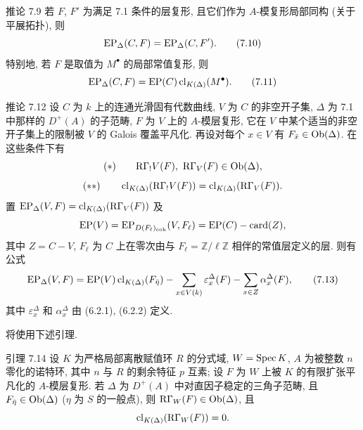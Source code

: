 \begin{statement}{推论 7.9}
若 $F$, $F'$ 为满足 7.1 条件的层复形, 且它们作为 $A$-模复形局部同构 (关于平展拓扑), 则
\[
\operatorname{EP}_\Delta(C,F)=\operatorname{EP}_\Delta(C,F').
\tag{7.10}
\]
特别地, 若 $F$ 是取值为 $M^\bullet$ 的局部常值复形, 则
\[
\operatorname{EP}_\Delta(C,F)=\operatorname{EP}(C)\operatorname{cl}_{K(\Delta)}(M^\bullet).
\tag{7.11}
\]
\end{statement}

\begin{statement}{推论 7.12}
设 $C$ 为 $k$ 上的连通光滑固有代数曲线, $V$ 为 $C$ 的非空开子集, $\Delta$ 为 7.1 中那样的 $D^+(A)$ 的子范畴, $F$ 为 $V$ 上的 $A$-模层复形, 它在 $V$ 中某个适当的非空开子集上的限制被 $V$ 的 Galois 覆盖平凡化. 再设对每个 $x\in V$ 有 $F_{\bar x}\in\operatorname{Ob}(\Delta)$. 在这些条件下有
\[
(*)\qquad \RG_!V(F),\ \RG_V(F)\in\Ob(\Delta),
\]
\[
(**)\qquad
\operatorname{cl}_{K(\Delta)}(\mathrm R\Gamma_!V(F))=\operatorname{cl}_{K(\Delta)}(\mathrm R\Gamma_V(F)).
\]
置 $\operatorname{EP}_\Delta(V,F)=\operatorname{cl}_{K(\Delta)}(\mathrm R\Gamma_V(F))$ 及
\[
\operatorname{EP}(V)=\operatorname{EP}_{D(F_\ell)_{\mathrm{coh}}}(V,F_\ell)=\operatorname{EP}(C)-\operatorname{card}(Z),
\]
其中 $Z=C-V$, $F_\ell$ 为 $C$ 上在零次由与 $F_\ell=\mathbb Z/\ell\mathbb Z$ 相伴的常值层定义的层. 则有公式
\[
\operatorname{EP}_\Delta(V,F)
=
\operatorname{EP}(V)\operatorname{cl}_{K(\Delta)}(F_{\bar\eta})
-\sum_{x\in V(k)}\varepsilon_x^\Delta(F)
-\sum_{x\in Z}\alpha_x^\Delta(F),
\tag{7.13}
\]
其中 $\varepsilon_x^\Delta$ 和 $\alpha_x^\Delta$ 由 (6.2.1), (6.2.2) 定义.
\end{statement}

将使用下述引理.

\begin{statement}{引理 7.14}
设 $K$ 为严格局部离散赋值环 $R$ 的分式域, $W=\operatorname{Spec} K$, $A$ 为被整数 $n$ 零化的诺特环, 其中 $n$ 与 $R$ 的剩余特征 $p$ 互素; 设 $F$ 为 $W$ 上被 $K$ 的有限扩张平凡化的 $A$-模层复形. 若 $\Delta$ 为 $D^+(A)$ 中对直因子稳定的三角子范畴, 且 $F_{\bar\eta}\in\operatorname{Ob}(\Delta)$ ($\eta$ 为 $S$ 的一般点), 则 $\mathrm R\Gamma_W(F)\in\operatorname{Ob}(\Delta)$, 且
\[
\operatorname{cl}_{K(\Delta)}(\mathrm R\Gamma_W(F))=0.
\]
\end{statement}

